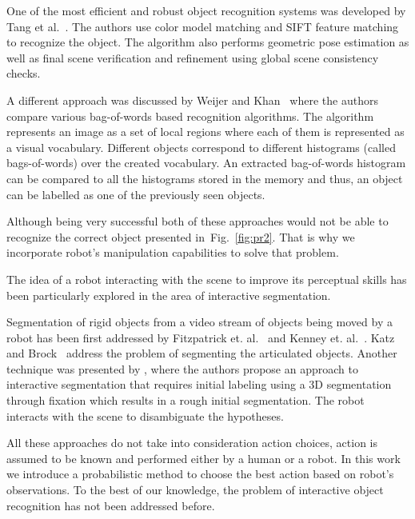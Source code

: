\documentclass[conference]{IEEEtran}
\newcommand{\figref}[1]{Fig.~\ref{#1}}
\begin{document}
	One of the most efficient and robust object recognition systems was developed by Tang et al.~\cite{tang2012textured}. The authors use color model matching and SIFT feature matching to recognize the object. The algorithm also performs geometric pose estimation as well as final scene verification and refinement using global scene consistency checks. 

A different approach was discussed by Weijer and Khan~\cite{van2013fusing} where the authors compare various bag-of-words based recognition algorithms. The algorithm represents an image as a set of local regions where each of them is represented as a visual vocabulary. Different objects correspond to different histograms (called bags-of-words) over the created vocabulary. An extracted bag-of-words histogram can be compared to all the histograms stored in the memory and thus, an object can be labelled as one of the previously seen objects.

Although being very successful both of these approaches would not be able to recognize the correct object presented in~\figref{fig:pr2}. That is why we incorporate robot's manipulation capabilities to solve that problem.

The idea of a robot interacting with the scene to improve its perceptual skills has been particularly explored in the area of interactive segmentation.

Segmentation of rigid objects from a video stream 
of objects being moved by a robot has been first addressed by Fitzpatrick et. al.~\cite{fitzpatrick_active_vision} and Kenney et. al.~\cite{KenneyInteractive}.
Katz and Brock~\cite{Katz-WS-MM-ICRA2011} address
the problem of segmenting the articulated objects. Another technique was presented by \cite{bergstrom11icvs}, where the authors propose  an   approach  to
interactive  segmentation that  requires initial  labeling using  a 3D
segmentation  through  fixation  which  results  in  a  rough  initial
segmentation. The robot interacts with the scene to disambiguate
the hypotheses.


All these approaches do not take into consideration action choices, action is assumed to be known and performed either by a human or a robot. In this work we introduce a probabilistic method to choose the best action based on robot's observations. To the best of our knowledge, the problem of interactive object recognition has not been addressed before. 
\end{document}
